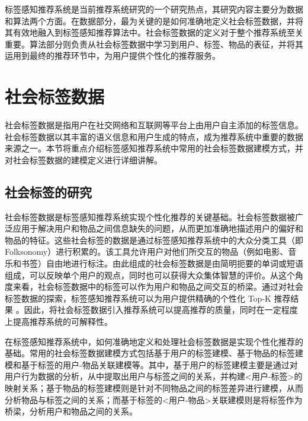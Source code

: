 标签感知推荐系统是当前推荐系统研究的一个研究热点，其研究内容主要分为数据和算法两个方面。在数据部分，最为关键的是如何准确地定义社会标签数据，并将其有效地融入到标签感知推荐算法中。社会标签数据的定义对于整个推荐系统至关重要。算法部分则负责从社会标签数据中学习到用户、标签、物品的表征，并将其运用到最终的推荐环节中，为用户提供个性化的推荐服务。

\section{社会标签数据}
社会标签数据是指用户在社交网络和互联网等平台上由用户自主添加的标签信息。社会标签数据以其丰富的语义信息和用户生成的特点，成为推荐系统中重要的数据来源之一。本节将重点介绍标签感知推荐系统中常用的社会标签数据建模方式，并对社会标签数据的建模定义进行详细讲解。
\subsection{社会标签的研究}
社会标签数据是标签感知推荐系统实现个性化推荐的关键基础。社会标签数据被广泛应用于解决用户和物品之间信息缺失的问题，从而更加准确地描述用户的偏好和物品的特征\cite{hutchison_information_2006, bischoff_can_2008}。这些社会标签的数据是通过标签感知推荐系统中的大众分类工具（即 Folksonomy）进行积累的。该工具允许用户对他们所交互的物品（例如电影、音乐和书签）自由地进行标注。由此组成的社会标签数据是由简明扼要的单词或短语组成，可以反映单个用户的观点，同时也可以获得大众集体智慧的评价。从这个角度来看，社会标签数据中的标签可以作为用户和物品之间交互的桥梁。通过对社会标签数据的探索，标签感知推荐系统可以为用户提供精确的个性化 Top-K 推荐结果 \cite{zuo_tag-aware_2016,li_tag-aware_2019,chen_tgcn_2020}。因此，将社会标签数据引入推荐系统可以提高推荐的质量，同时在一定程度上提高推荐系统的可解释性。

在标签感知推荐系统中，如何准确地定义和处理社会标签数据是实现个性化推荐的基础。常用的社会标签数据建模方式包括基于用户的标签建模、基于物品的标签建模和基于标签的用户-物品关联建模等。其中，基于用户的标签建模主要是通过对用户行为数据的分析，从中提取出用户与标签之间的关系，并构建<用户-标签>的映射关系；基于物品的标签建模则是针对不同物品之间的标签差异进行建模，从而分析物品与标签之间的关系；而基于标签的<用户-物品>关联建模则是将标签作为桥梁，分析用户和物品之间的关系。

